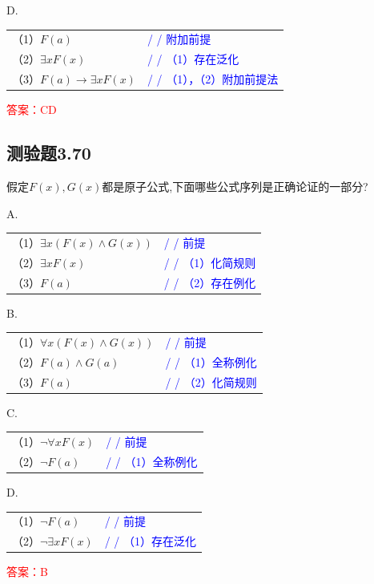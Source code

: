 \documentclass[UTF8, heading=true]{ctexart}
\begin{document}
D. 

\begin{tabular}{ll}
  （1）$F(a)$ & \textcolor{blue}{/ / 附加前提} \\
  （2）$\exists x F(x)$ & \textcolor{blue}{/ / （1）存在泛化} \\
  （3）$F(a) \rightarrow \exists x F(x)$ & \textcolor{blue}{/ / （1），（2）附加前提法}
\end{tabular}


\textcolor{red}{答案：CD}


\subsection{测验题3.70}

假定$F(x),G(x)$都是原子公式,下面哪些公式序列是正确论证的一部分?

A. 

\begin{tabular}{ll}
  （1）$\exists x(F(x) \wedge G(x))$ & \textcolor{blue}{/ / 前提} \\
  （2）$\exists x F(x)$ & \textcolor{blue}{/ / （1）化简规则} \\
  （3）$F(a)$ & \textcolor{blue}{/ / （2）存在例化}
\end{tabular}

B. 

\begin{tabular}{ll}
  （1）$\forall x(F(x) \wedge G(x))$ & \textcolor{blue}{/ / 前提} \\
  （2）$F(a) \wedge G(a)$ & \textcolor{blue}{/ / （1）全称例化} \\
  （3）$F(a)$ & \textcolor{blue}{/ / （2）化简规则}
\end{tabular}


C. 

\begin{tabular}{ll}
  （1）$\neg \forall x F(x)$ & \textcolor{blue}{/ / 前提} \\
  （2）$\neg F(a)$ & \textcolor{blue}{/ / （1）全称例化}
\end{tabular}

D. 

\begin{tabular}{ll}
  （1）$\neg F(a)$ & \textcolor{blue}{/ / 前提} \\
  （2）$\neg \exists x F(x)$ & \textcolor{blue}{/ / （1）存在泛化}
\end{tabular}


\textcolor{red}{答案：B}
\end{document}
